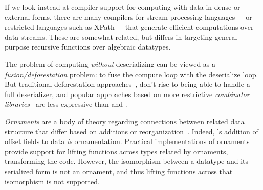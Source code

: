 \documentclass[showabstract,showacknowledgments,showpreface,showdedication]{iuphd}
\theoremstyle{nonumberplain}
\begin{document}
If we look instead at compiler support for computing with data in dense or
external forms, there are many compilers for stream processing
languages~\cite{streamit,wavescript-nsdi}---or restricted languages such as
XPath~\cite{xpath-streams}---that generate efficient computations over data
streams.
These are somewhat related, but \ourcalc differs in targeting general
purpose recursive functions over algebraic datatypes.
%

The problem of computing \emph{without} deserializing can be viewed as a
\emph{{fusion/deforestation}} problem: to fuse the compute loop with the
deserialize loop.  But traditional deforestation
approaches~\cite{wadler-deforestation}, don't rise to being able to handle
a full deserializer, and popular approaches based on more restrictive {\em combinator
libraries}~\cite{stream-fusion} are less expressive than \lamadt and \ourcalc.

\emph{Ornaments} are a body of theory regarding connections between related
data structure that differ based on additions or
reorganization~\cite{ornaments}.
%
Indeed, \ourcalc's addition of offset fields to data {\em is} ornamentation.
%
Practical implementations of ornaments~\cite{ornament-ml} provide support for
lifting functions across types related by ornaments, transforming the code.
%
However, the isomorphism between a datatype and its serialized form is not an
ornament, and thus lifting functions across that isomorphism is not supported.

\end{document}

